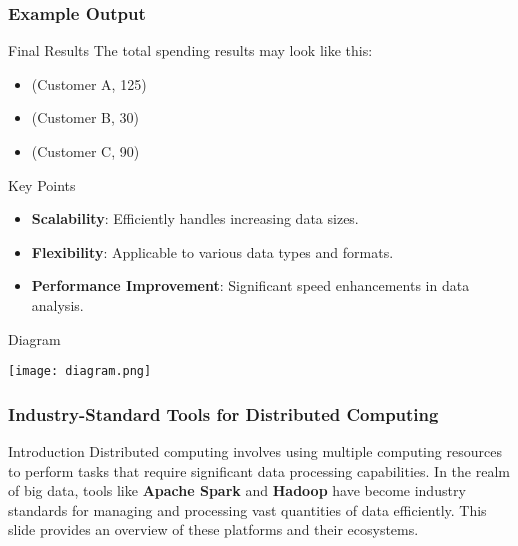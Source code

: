 \documentclass[aspectratio=169]{beamer}
\begin{document}
\begin{frame}[fragile]
    \frametitle{Example Output}
    \begin{block}{Final Results}
        The total spending results may look like this:
        \begin{itemize}
            \item (Customer A, 125)
            \item (Customer B, 30)
            \item (Customer C, 90)
        \end{itemize}
    \end{block}

    \begin{block}{Key Points}
        \begin{itemize}
            \item \textbf{Scalability}: Efficiently handles increasing data sizes.
            \item \textbf{Flexibility}: Applicable to various data types and formats.
            \item \textbf{Performance Improvement}: Significant speed enhancements in data analysis.
        \end{itemize}
    \end{block}

    \begin{block}{Diagram}
        \begin{center}
        \texttt{[image: diagram.png]} %
        \end{center}
    \end{block}
\end{frame}

\begin{frame}[fragile]
    \frametitle{Industry-Standard Tools for Distributed Computing}
    
    \begin{block}{Introduction}
        Distributed computing involves using multiple computing resources to perform tasks that require significant data processing capabilities. In the realm of big data, tools like \textbf{Apache Spark} and \textbf{Hadoop} have become industry standards for managing and processing vast quantities of data efficiently. This slide provides an overview of these platforms and their ecosystems.
    \end{block}
\end{frame}
\end{document}
